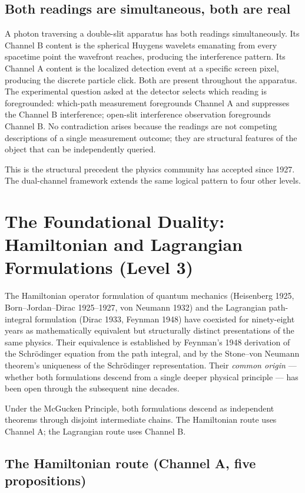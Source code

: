 \documentclass[11pt,a4paper]{article}
\begin{document}
\subsection{Both readings are simultaneous, both are real}

A photon traversing a double-slit apparatus has both readings simultaneously. Its Channel B content is the spherical Huygens wavelets emanating from every spacetime point the wavefront reaches, producing the interference pattern. Its Channel A content is the localized detection event at a specific screen pixel, producing the discrete particle click. Both are present throughout the apparatus. The experimental question asked at the detector selects which reading is foregrounded: which-path measurement foregrounds Channel A and suppresses the Channel B interference; open-slit interference observation foregrounds Channel B. No contradiction arises because the readings are not competing descriptions of a single measurement outcome; they are structural features of the object that can be independently queried.

This is the structural precedent the physics community has accepted since 1927. The dual-channel framework extends the same logical pattern to four other levels.

\section{The Foundational Duality: Hamiltonian and Lagrangian Formulations (Level 3)}
\label{sec:foundational}

The Hamiltonian operator formulation of quantum mechanics (Heisenberg 1925, Born--Jordan--Dirac 1925--1927, von Neumann 1932) and the Lagrangian path-integral formulation (Dirac 1933, Feynman 1948) have coexisted for ninety-eight years as mathematically equivalent but structurally distinct presentations of the same physics. Their equivalence is established by Feynman's 1948 derivation of the Schr\"odinger equation from the path integral, and by the Stone--von Neumann theorem's uniqueness of the Schr\"odinger representation. Their \emph{common origin} --- whether both formulations descend from a single deeper physical principle --- has been open through the subsequent nine decades.

Under the McGucken Principle, both formulations descend as independent theorems through disjoint intermediate chains. The Hamiltonian route uses Channel A; the Lagrangian route uses Channel B.

\subsection{The Hamiltonian route (Channel A, five propositions)}
\end{document}
